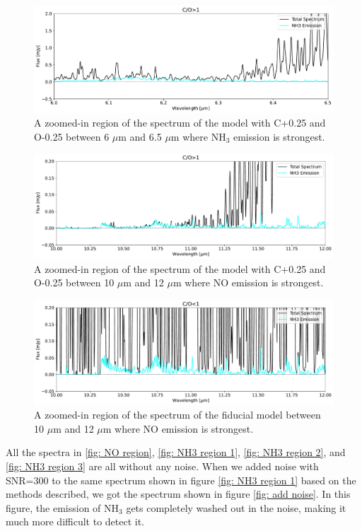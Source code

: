 \documentclass[twoside, single, authoryear, semicolon]{lion-msc}
\newcommand{\4}{$_4$}
\newcommand{\3}{$_3$}
\newcommand{\2}{$_2$}
\begin{document}
\begin{figure}[!ht]
    \centering
    \includegraphics[width=\linewidth]{Figures/NH3_region1.pdf}
    \caption{A zoomed-in region of the spectrum of the model with C+0.25 and O-0.25 between 6 $\mu$m and 6.5 $\mu$m where NH\3 emission is strongest.}
    \label{fig: NH3 region 1}
\end{figure}
\begin{figure}[!ht]
    \centering
    \includegraphics[width=\linewidth]{Figures/NH3_region2.pdf}
    \caption{A zoomed-in region of the spectrum of the model with C+0.25 and O-0.25 between 10 $\mu$m and 12 $\mu$m where NO emission is strongest.}
    \label{fig: NH3 region 2}
\end{figure}
\begin{figure}[!ht]
    \centering
    \includegraphics[width=\linewidth]{Figures/NH3_region3.pdf}
    \caption{A zoomed-in region of the spectrum of the fiducial model between 10 $\mu$m and 12 $\mu$m where NO emission is strongest.}
    \label{fig: NH3 region 3}
\end{figure}

All the spectra in \autoref{fig: NO region}, \autoref{fig: NH3 region 1}, \autoref{fig: NH3 region 2}, and \autoref{fig: NH3 region 3} are all without any noise. When we added noise with SNR=300 to the same spectrum shown in figure \autoref{fig: NH3 region 1} based on the methods described, we got the spectrum shown in figure \autoref{fig: add noise}. In this figure, the emission of NH\3 gets completely washed out in the noise, making it much more difficult to detect it.  
\end{document}
